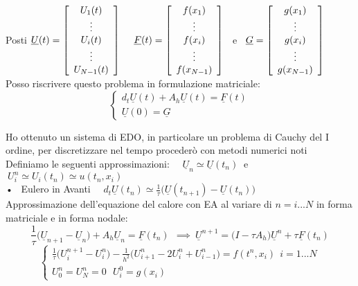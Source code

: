 \documentclass{article}
\renewcommand{\vv}[1]{\underline{#1}}
\begin{document}
Posti $\vv{U}(t)=\OO \begin{array}{c} U_1(t) \\ \vdots \\ U_i(t) \\ \vdots \\ U_{N-1}(t) \end{array} \CC$ \ \ $\vv{F}(t)=\OO \begin{array}{c} f(x_1) \\ \vdots \\ f(x_i) \\ \vdots \\ f(x_{N-1}) \end{array} \CC$  \ e \ $\vv{G}=\OO \begin{array}{c} g(x_1) \\ \vdots \\ g(x_i) \\ \vdots \\ g(x_{N-1}) \end{array} \CC$ \skipp\\
Posso riscrivere questo problema in formulazione matriciale:
\[
\begin{cases}
    d_t \vv{U}(t) + A_h \vv{U}(t)=\vv{F}(t)\\
    \vv{U}(0)= \vv{G}
\end{cases}
\]
\phantom{}

Ho ottenuto un sistema di EDO, in particolare un problema di Cauchy del I ordine, per discretizzare nel tempo procederò con metodi numerici noti\\

Definiamo le seguenti approssimazioni: \ \ $\vv{U}_n\simeq \vv{U}(t_n) \ $ e $\ U^n_i\simeq U_i(t_n) \simeq u(t_n,x_i)$ \\

• \ Eulero in Avanti \ \ $d_t \vv{U}(t_n)\simeq \frac{1}{\tau}\big(\vv{U}(t_{n+1})-\vv{U}(t_n)\big)$\\
Approssimazione dell'equazione del calore con EA al variare di $n=i...N$ in forma matriciale e in forma nodale:
\[
\frac{1}{\tau}\big(\vv{U}_{n+1}-\vv{U}_n\big) + A_h\vv{U}_n = \vv{F}(t_n) \ \ \implies \ \vv{U}^{n+1}=\big( I-\tau A_h \big)\vv{U}^n + \tau \vv{F}(t_n)
\]
\[
\begin{cases}
    \frac{1}{\tau}\big(U_i^{n+1}-U_i^n\big) - \frac{1}{h^2}\big( U_{i+1}^n - 2U_i^n + U_{i-1}^n \big) = f(t^n,x_i) \ \ i=1...N\\
    U_0^n=U_N^n=0 \ \ \
    U_i^0=g(x_i)
\end{cases}
\]
\end{document}
